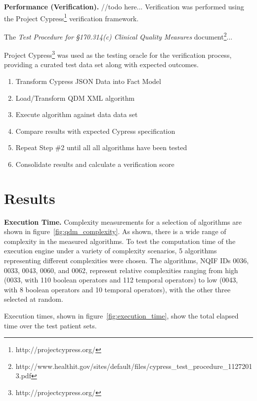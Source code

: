 \documentclass{amia}
\begin{document}
\textbf{Performance (Verification).}
//todo here...
Verification was performed using the Project Cypress\footnote{http://projectcypress.org/} verification framework.

The \textit{Test Procedure for §170.314(c) Clinical Quality Measures} document\footnote{http://www.healthit.gov/sites/default/files/cypress\_test\_procedure\_11272013.pdf}...

Project Cypress\footnote{http://projectcypress.org/} was used as the testing oracle for the verification process, providing a curated test data set along with expected outcomes.

\begin{enumerate}
  \item Transform Cypress JSON Data into Fact Model
  \item Load/Transform QDM XML algorithm
  \item Execute algorithm against data data set
  \item Compare results with expected Cypress specification
  \item Repeat Step \#2 until all all algorithms have been tested
  \item Consolidate results and calculate a verification score
\end{enumerate}


\section*{Results}

\textbf{Execution Time.}
Complexity measurements for a selection of algorithms are shown in figure~\ref{fig:qdm_complexity}. As shown, there is a wide range of complexity in the measured algorithms. To test the computation time of the execution engine under a variety of complexity scenarios, 5 algorithms representing different complexities were chosen. The algorithms, NQIF IDs 0036, 0033, 0043, 0060, and 0062, represent relative complexities ranging from high (0033, with 110 boolean operators and 112 temporal operators) to low (0043, with 8 boolean operators and 10 temporal operators), with the other three selected at random.

Execution times, shown in figure~\ref{fig:execution_time}, show the total elapsed time over the test patient sets.
\end{document}
